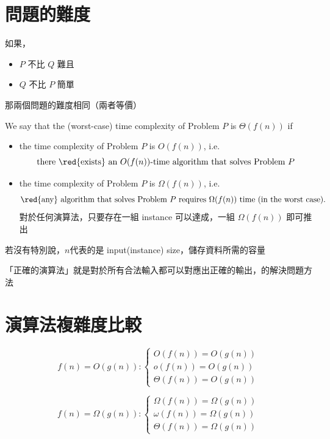 
\section{問題的難度}


如果，
\begin{itemize}
    \item $P$ 不比 $Q$ 難且
    \item $Q$ 不比 $P$ 簡單
\end{itemize}
那兩個問題的難度相同（兩者等價）

\begin{definition}
    We say that the (worst-case) time complexity of Problem $P$ is $\Theta(f(n))$ if
    \begin{itemize}
        \item the time complexity of Problem $P$ is $O(f(n))$, i.e.
            \[
                \text{there \red{exists} an }O(f(n))\text{-time algorithm that solves Problem }P
            \]
        \item the time complexity of Problem $P$ is $\Omega(f (n))$, i.e. 
            \[
                \text{\red{any} algorithm that solves Problem }P\text{ requires }\Omega(f (n))\text{ time (in the worst case).}
            \]
        對於任何演算法，只要存在一組 instance 可以達成，一組 $\Omega(f(n))$ 即可推出
    \end{itemize}
\end{definition}

\begin{note}
若沒有特別說，$n$代表的是 input(instance) size，儲存資料所需的容量
\end{note}

\begin{note}
「正確的演算法」就是對於所有合法輸入都可以對應出正確的輸出，的解決問題方法
\end{note}

\section{演算法複雜度比較}
\[
f(n) = O(g(n)) : 
\begin{cases}
O(f(n)) = O(g(n)) \\
o(f(n)) = O(g(n)) \\
\Theta(f(n)) = O(g(n))
\end{cases}
\]

\[
f(n) = \Omega(g(n)) : 
\begin{cases}
\Omega(f(n)) = \Omega(g(n)) \\
\omega(f(n)) = \Omega(g(n)) \\
\Theta(f(n)) = \Omega(g(n))
\end{cases}
\]

